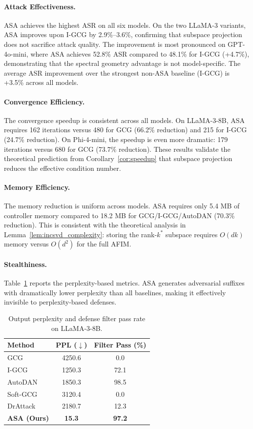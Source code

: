 \documentclass[preprint,12pt]{elsarticle}
\begin{document}
\paragraph{Attack Effectiveness.} ASA achieves the highest ASR on all six models. On the two LLaMA-3 variants, ASA improves upon I-GCG by 2.9\%--3.6\%, confirming that subspace projection does not sacrifice attack quality. The improvement is most pronounced on GPT-4o-mini, where ASA achieves 52.8\% ASR compared to 48.1\% for I-GCG (+4.7\%), demonstrating that the spectral geometry advantage is not model-specific. The average ASR improvement over the strongest non-ASA baseline (I-GCG) is +3.5\% across all models.

\paragraph{Convergence Efficiency.} The convergence speedup is consistent across all models. On LLaMA-3-8B, ASA requires 162 iterations versus 480 for GCG (66.2\% reduction) and 215 for I-GCG (24.7\% reduction). On Phi-4-mini, the speedup is even more dramatic: 179 iterations versus 680 for GCG (73.7\% reduction). These results validate the theoretical prediction from Corollary~\ref{cor:speedup} that subspace projection reduces the effective condition number.

\paragraph{Memory Efficiency.} The memory reduction is uniform across models. ASA requires only 5.4 MB of controller memory compared to 18.2 MB for GCG/I-GCG/AutoDAN (70.3\% reduction). This is consistent with the theoretical analysis in Lemma~\ref{lem:incsvd_complexity}: storing the rank-$k^*$ subspace requires $O(dk)$ memory versus $O(d^2)$ for the full AFIM.

\paragraph{Stealthiness.} Table~\ref{tab:perplexity} reports the perplexity-based metrics. ASA generates adversarial suffixes with dramatically lower perplexity than all baselines, making it effectively invisible to perplexity-based defenses.

\begin{table}[t]
\centering
\caption{Output perplexity and defense filter pass rate on LLaMA-3-8B.}
\label{tab:perplexity}
\begin{tabular}{lcc}
\toprule
\textbf{Method} & \textbf{PPL ($\downarrow$)} & \textbf{Filter Pass (\%)} \\
\midrule
GCG & 4250.6 & 0.0 \\
I-GCG & 1250.3 & 72.1 \\
AutoDAN & 1850.3 & 98.5 \\
Soft-GCG & 3120.4 & 0.0 \\
DrAttack & 2180.7 & 12.3 \\
\rowcolor[gray]{0.9}
\textbf{ASA (Ours)} & \textbf{15.3} & \textbf{97.2} \\
\bottomrule
\end{tabular}
\end{table}
\end{document}
